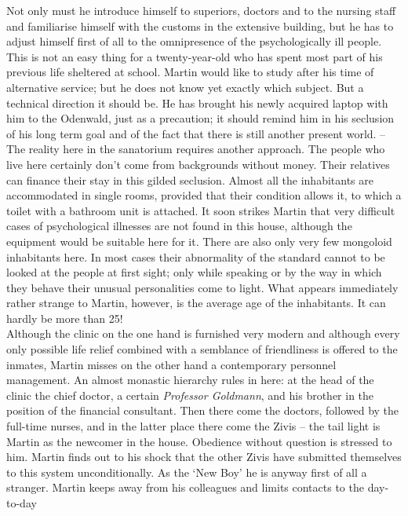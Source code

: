 Not only must he introduce himself to superiors, doctors and to the nursing staff and
familiarise himself with the customs in the extensive building, but he has to adjust
himself first of all to the omnipresence of the psychologically ill people. 
This is not an easy thing for a twenty-year-old who has spent most part of his 
previous life sheltered at school.
Martin would like to study after his time of alternative service; but he does not 
know yet exactly which subject.
But a technical direction it should be. 
He has brought his newly acquired laptop with him to the Odenwald, just as a 
precaution; it should remind him in his seclusion of his long term goal and of the 
fact that there is still another present world. -- \\ 
The reality here in the sanatorium requires another approach. 
The people who live here certainly don't come from backgrounds without money. Their 
relatives can finance their stay in this gilded seclusion. 
Almost all the inhabitants are accommodated in single rooms, provided that their 
condition allows it, to which a toilet with a bathroom unit is attached. 
It soon strikes Martin that very difficult cases of psychological illnesses are not 
found in this house, although the equipment would be suitable here for it. 
There are also only very few mongoloid inhabitants here.
In most cases their abnormality of the standard cannot to be looked at the people at 
first sight; only while speaking or by the way in which they behave their unusual
personalities come to light. 
What appears immediately rather strange to Martin, however, is the average age of 
the inhabitants. 
It can hardly be more than 25! \\ 
Although the clinic on the one hand is furnished very modern and although every only
possible life relief combined with a semblance of friendliness is offered to the inmates, 
Martin misses on the other hand a contemporary personnel management. 
An almost monastic hierarchy rules in here: at the head of the clinic the chief 
doctor, a certain {\em Professor Goldmann\/}, and his brother in the position of
the financial consultant.
Then there come the doctors, followed by the full-time nurses, and in the latter
place there come the Zivis -- the tail light is Martin as the newcomer in the house. 
Obedience without question is stressed to him. 
Martin finds out to his shock that the other Zivis have submitted themselves to this
system unconditionally. 
As the `New Boy' he is anyway first of all a stranger. 
Martin keeps away from his colleagues and limits contacts to the day-to-day 
